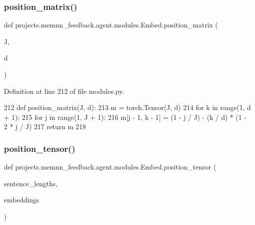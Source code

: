 \mbox{\label{classprojects_1_1memnn__feedback_1_1agent_1_1modules_1_1Embed_a493bb5875793e19802cfc1ed7abfdfaa}} 
\subsubsection{\texorpdfstring{position\+\_\+matrix()}{position\_matrix()}}
{\footnotesize\ttfamily def projects.\+memnn\+\_\+feedback.\+agent.\+modules.\+Embed.\+position\+\_\+matrix (\begin{DoxyParamCaption}\item[{}]{J,  }\item[{}]{d }\end{DoxyParamCaption})}



Definition at line 212 of file modules.\+py.


\begin{DoxyCode}
212     \textcolor{keyword}{def }position\_matrix(J, d):
213         m = torch.Tensor(J, d)
214         \textcolor{keywordflow}{for} k \textcolor{keywordflow}{in} range(1, d + 1):
215             \textcolor{keywordflow}{for} j \textcolor{keywordflow}{in} range(1, J + 1):
216                 m[j - 1, k - 1] = (1 - j / J) - (k / d) * (1 - 2 * j / J)
217         \textcolor{keywordflow}{return} m
218 
\end{DoxyCode}
\mbox{\label{classprojects_1_1memnn__feedback_1_1agent_1_1modules_1_1Embed_a53662ab0fd08d06071b2321685a24723}} 
\subsubsection{\texorpdfstring{position\+\_\+tensor()}{position\_tensor()}}
{\footnotesize\ttfamily def projects.\+memnn\+\_\+feedback.\+agent.\+modules.\+Embed.\+position\+\_\+tensor (\begin{DoxyParamCaption}\item[{}]{sentence\+\_\+lengths,  }\item[{}]{embeddings }\end{DoxyParamCaption})\hspace{0.3cm}{\ttfamily [static]}}



